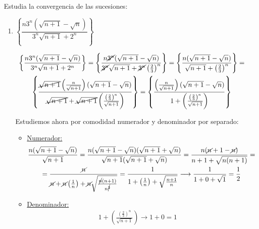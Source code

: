 \documentclass[12pt]{article}
\begin{document}
    \begin{ejercicio}[4 puntos]
        Estudia la convergencia de las sucesiones:
        \begin{enumerate}
            \item $\left\{ \dfrac{n 3^n (\sqrt{n+1}-\sqrt{n})}{3^n \sqrt{n+1}+2^n} \right\}$
            
            \begin{gather*}
                \left\{ \dfrac{n 3^n (\sqrt{n+1}-\sqrt{n})}{3^n \sqrt{n+1}+2^n} \right\} = 
                \left\{ \dfrac{n \cancel{3^n} (\sqrt{n+1}-\sqrt{n})}{\cancel{3^n} \sqrt{n+1}+\cancel{3^n}\left(\frac{2}{3}\right)^n} \right\} = 
                 \left\{ \dfrac{n(\sqrt{n+1}-\sqrt{n})}{\sqrt{n+1}+\left(\frac{2}{3}\right)^n} \right\} =\\
                \left\{ \dfrac{\cancel{\sqrt{n+1}}\left(\frac{n}{\sqrt{n+1}}\right) (\sqrt{n+1}-\sqrt{n})}{\cancel{\sqrt{n+1}}+\cancel{\sqrt{n+1}}\left(\frac{\left(\frac{2}{3}\right)^n}{\sqrt{n+1}}\right)} \right\}=
                \left\{ \dfrac{\left(\frac{n}{\sqrt{n+1}}\right) (\sqrt{n+1}-\sqrt{n})}{1+\left(\frac{\left(\frac{2}{3}\right)^n}{\sqrt{n+1}}\right)} \right\}
            \end{gather*}

            Estudiemos ahora por comodidad numerador y denominador por separado:
            \begin{itemize}[label=$\ast$]
                \item \underline{Numerador:}
                \begin{gather*}
                    \dfrac{n (\sqrt{n+1}-\sqrt{n})}{\sqrt{n+1}} = \dfrac{n (\sqrt{n+1}-\sqrt{n})(\sqrt{n+1}+\sqrt{n}) }{\sqrt{n+1}(\sqrt{n+1}+\sqrt{n})} = \dfrac{n(\cancel{n}+1-\cancel{n})}{n+1+\sqrt{n(n+1)}}=\\
                    =\dfrac{\cancel{n}}{\cancel{n}+\cancel{n}\left( \frac{1}{n}\right)+\cancel{n} \sqrt{\frac{\cancel{n}(n+1)}{n^{\cancel{2}}}}} = \dfrac{1}{1+\left( \frac{1}{n}\right) + \sqrt{\frac{n+1}{n}}} \longrightarrow \dfrac{1}{1+0+\sqrt{1}}=\dfrac{1}{2}
                \end{gather*}

                \item \underline{Denominador:}
                \begin{gather*}
                    1+\left(\frac{\left(\frac{2}{3}\right)^n}{\sqrt{n+1}} \right) \longrightarrow 1 + 0= 1
                \end{gather*}
            \end{itemize}


\end{enumerate}
\end{ejercicio}
\end{document}
